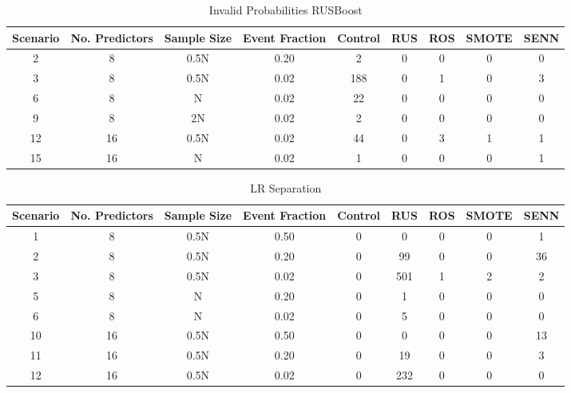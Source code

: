 \documentclass[
]{article}
\begin{document}
\begin{table}[!h]

\caption{\label{tab:tab:invalid_ps}Invalid Probabilities RUSBoost}
\centering
\begin{tabular}[t]{ccccccccc}
\toprule
Scenario & No. Predictors & Sample Size & Event Fraction & Control & RUS & ROS & SMOTE & SENN\\
\midrule
2 & 8 & 0.5N & 0.20 & 2 & 0 & 0 & 0 & 0\\
 
3 & 8 & 0.5N & 0.02 & 188 & 0 & 1 & 0 & 3\\
 
6 & 8 & N & 0.02 & 22 & 0 & 0 & 0 & 0\\
 
9 & 8 & 2N & 0.02 & 2 & 0 & 0 & 0 & 0\\
 
12 & 16 & 0.5N & 0.02 & 44 & 0 & 3 & 1 & 1\\
 
15 & 16 & N & 0.02 & 1 & 0 & 0 & 0 & 1\\
\bottomrule
\end{tabular}
\end{table}

\begin{table}[!h]

\caption{\label{tab:invalid_ps}LR Separation}
\centering
\begin{tabular}[t]{ccccccccc}
\toprule
Scenario & No. Predictors & Sample Size & Event Fraction & Control & RUS & ROS & SMOTE & SENN\\
\midrule
1 & 8 & 0.5N & 0.50 & 0 & 0 & 0 & 0 & 1\\
 
2 & 8 & 0.5N & 0.20 & 0 & 99 & 0 & 0 & 36\\
 
3 & 8 & 0.5N & 0.02 & 0 & 501 & 1 & 2 & 2\\
 
5 & 8 & N & 0.20 & 0 & 1 & 0 & 0 & 0\\
 
6 & 8 & N & 0.02 & 0 & 5 & 0 & 0 & 0\\
 
10 & 16 & 0.5N & 0.50 & 0 & 0 & 0 & 0 & 13\\
 
11 & 16 & 0.5N & 0.20 & 0 & 19 & 0 & 0 & 3\\
 
12 & 16 & 0.5N & 0.02 & 0 & 232 & 0 & 0 & 0\\
\bottomrule
\end{tabular}
\end{table}
\end{document}
